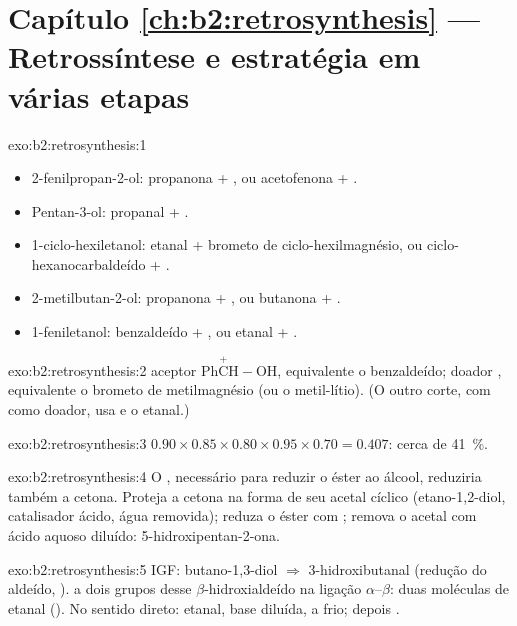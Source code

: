 \section*{Capítulo \ref{ch:b2:retrosynthesis} --- Retrossíntese e estratégia em várias etapas}

\begin{solution}{exo:b2:retrosynthesis:1}
\begin{itemize}
  \item 2-fenilpropan-2-ol: propanona + , ou acetofenona + .
  \item Pentan-3-ol: propanal + .
  \item 1-ciclo-hexiletanol: etanal + brometo de ciclo-hexilmagnésio, ou ciclo-hexanocarbaldeído +
        .
  \item 2-metilbutan-2-ol: propanona + , ou butanona + .
  \item 1-feniletanol: benzaldeído + , ou etanal + .
\end{itemize}
\end{solution}

\begin{solution}{exo:b2:retrosynthesis:2}
 aceptor $\mathrm{Ph\overset{+}{C}H{-}OH}$, equivalente o benzaldeído;  doador ,
equivalente o brometo de metilmagnésio (ou o metil-lítio). (O outro corte, com  como doador,
usa  e o etanal.)
\end{solution}

\begin{solution}{exo:b2:retrosynthesis:3}
$0.90 \times 0.85 \times 0.80 \times 0.95 \times 0.70 = 0.407$: cerca de 41~\%.
\end{solution}

\begin{solution}{exo:b2:retrosynthesis:4}
O , necessário para reduzir o éster ao álcool, reduziria também a cetona. Proteja a
cetona na forma de seu acetal cíclico (etano-1,2-diol, catalisador ácido, água removida); reduza o
éster com ; remova o acetal com ácido aquoso diluído: 5-hidroxipentan-2-ona.
\end{solution}

\begin{solution}{exo:b2:retrosynthesis:5}
IGF: butano-1,3-diol $\Rightarrow$ 3-hidroxibutanal (redução do aldeído, ).  a
dois grupos desse $\beta$-hidroxialdeído na ligação $\alpha$--$\beta$: duas moléculas de etanal
(). No sentido direto: etanal, base diluída, a frio; depois .
\end{solution}

